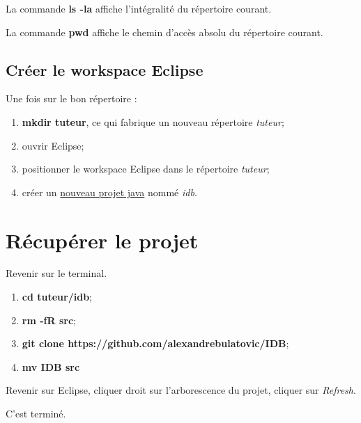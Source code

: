 La commande \textbf{ls -la} affiche l'intégralité du répertoire courant.

La commande \textbf{pwd} affiche le chemin d'accès absolu du répertoire courant.

\subsection{Créer le workspace Eclipse}
Une fois sur le bon répertoire :
\begin{enumerate}
\item \textbf{mkdir tuteur}, ce qui fabrique un nouveau répertoire \textit{tuteur};
\item ouvrir Eclipse;
\item positionner le workspace Eclipse dans le répertoire \textit{tuteur};
\item créer un \underline{nouveau projet java} nommé \textit{idb}.
\end{enumerate}

\section{Récupérer le projet}
Revenir sur le terminal.
\begin{enumerate}
\item \textbf{cd tuteur/idb};
\item \textbf{rm -fR src};
\item \textbf{git clone https://github.com/alexandrebulatovic/IDB};
\item \textbf{mv IDB src}
\end{enumerate}

Revenir sur Eclipse, cliquer droit sur l'arborescence du projet, cliquer sur \textit{Refresh}.

C'est terminé.



